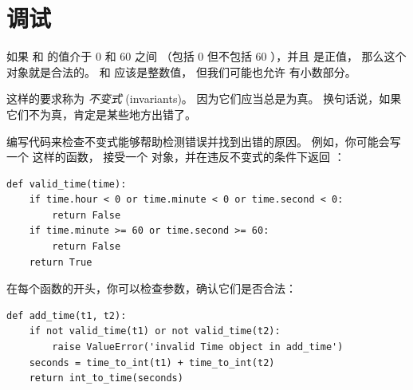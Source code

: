 {%
\section{调试}


如果  和  的值介于 0 和 60 之间
（包括 0 但不包括 60 ），并且  是正值， 那么这个 
对象就是合法的。  和  应该是整数值，
但我们可能也允许   有小数部分。


这样的要求称为 {\em 不变式} (invariants)。 因为它们应当总是为真。
换句话说，如果它们不为真，肯定是某些地方出错了。


编写代码来检查不变式能够帮助检测错误并找到出错的原因。
例如，你可能会写一个  这样的函数，
接受一个  对象，并在违反不变式的条件下返回  ：

\begin{lstlisting}
def valid_time(time):
    if time.hour < 0 or time.minute < 0 or time.second < 0:
        return False
    if time.minute >= 60 or time.second >= 60:
        return False
    return True
\end{lstlisting}

%

在每个函数的开头，你可以检查参数，确认它们是否合法：

  

\begin{lstlisting}
def add_time(t1, t2):
    if not valid_time(t1) or not valid_time(t2):
        raise ValueError('invalid Time object in add_time')
    seconds = time_to_int(t1) + time_to_int(t2)
    return int_to_time(seconds)
\end{lstlisting}

}
